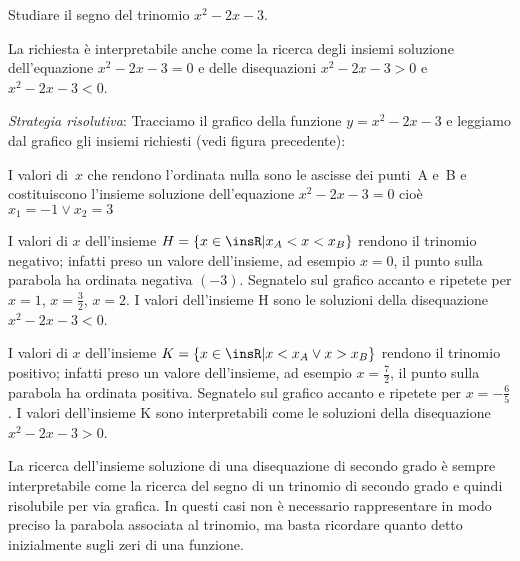 \begin{esempio}
Studiare il segno del trinomio \(x^2-2x-3\).

La richiesta è interpretabile anche come la ricerca degli insiemi soluzione 
dell'equazione \(x^2-2x-3=0\) e delle disequazioni \(x^2-2x-3>0\) e \(x^2-2x-3<0\).

\emph{Strategia risolutiva}:
Tracciamo il grafico della funzione \(y=x^2-2x-3\) e leggiamo dal grafico gli 
insiemi richiesti (vedi figura precedente):
\begin{itemize*}
\item I valori di~\(x\) che rendono l'ordinata nulla sono le ascisse dei 
punti~A 
e~B e costituiscono l'insieme soluzione dell'equazione \(x^2-2x-3=0\) cioè 
\(x_1=-1\vee x_2=3\)
\item I valori di \(x\) dell'insieme \(H=\{x\in \insR | x_A<x<x_B\}\) rendono il 
trinomio negativo; infatti preso un valore dell'insieme, ad esempio \(x=0\), il 
punto sulla parabola ha ordinata negativa \((-3)\). Segnatelo sul grafico 
accanto 
e ripetete per \(x=1\), \(x=\frac 3 2\), \(x=2\).
I valori dell'insieme H sono le soluzioni della disequazione \(x^2-2x-3<0\).
\item I valori di \(x\) dell'insieme \(K=\{x\in \insR | x<x_A\vee x>x_B\}\) 
rendono 
il trinomio positivo; infatti preso un valore dell'insieme, ad esempio 
\(x=\frac 
7 2\), il punto sulla parabola ha ordinata positiva. Segnatelo sul grafico 
accanto e ripetete per \(x=-\frac{6}{5}\).
I valori dell'insieme K sono interpretabili come le soluzioni della 
disequazione 
\(x^2-2x-3>0\).
\end{itemize*}
\end{esempio}

\osservazione La ricerca dell'insieme soluzione di una disequazione di 
secondo 
grado è sempre interpretabile come la ricerca del segno di un trinomio di 
secondo grado e quindi risolubile per via grafica. In questi casi non è 
necessario rappresentare in modo preciso la parabola associata al trinomio, 
ma 
basta ricordare quanto detto inizialmente sugli zeri di una funzione.

